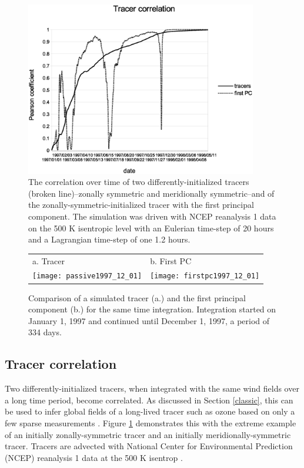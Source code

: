 \begin{figure}
\begin{center}
\includegraphics[width=0.9\textwidth]{tracer_correlation}
\caption{The correlation over time of two differently-initialized tracers
(broken line)--zonally symmetric and meridionally symmetric--and of
the zonally-symmetric-initialized tracer with the first principal component.
The simulation was driven with NCEP reanalysis 1 data on the 500 K isentropic
level with an Eulerian time-step of 20 hours and a Lagrangian time-step
of one 1.2 hours.}\label{tcorr}
\end{center}
\end{figure}

\begin{figure}
\begin{tabular}{ll}
a. Tracer & b. First PC\\
\texttt{[image: passive1997\_12\_01]} &
\texttt{[image: firstpc1997\_12\_01]}
\end{tabular}
\caption{Comparison of a simulated tracer (a.) and the first principal
component (b.) for the same time integration.
Integration started on January 1, 1997 and continued until December 1, 1997, a period of 334 days.}\label{pc1}
\end{figure}

\subsection{Tracer correlation}

Two differently-initialized tracers, when integrated with the same
wind fields over a long time period, become correlated.
As discussed in Section \ref{classic},
this can be used to infer global fields of a long-lived tracer such as
ozone based on only a few sparse measurements 
\citep{Allen_Nakamura2003,Randall_etal2002}.
Figure \ref{tcorr} demonstrates this with the extreme example of an initially
zonally-symmetric tracer and an initially meridionally-symmetric tracer.
Tracers are advected with National Center for Environmental Prediction
(NCEP) reanalysis 1 data at the 500 K isentrop \citep{Kalnay_etal1996}.

